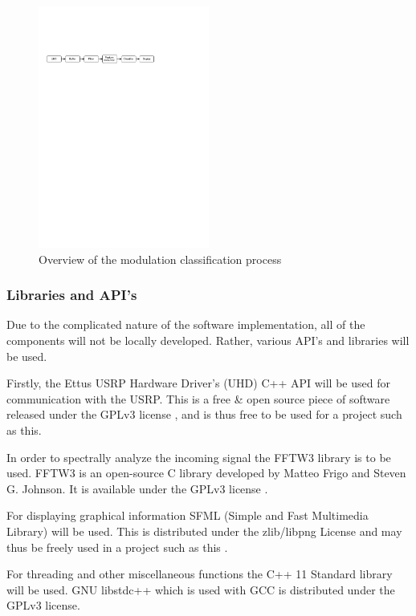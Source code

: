 \documentclass[10pt,twocolumn]{witseiepaper}
\begin{document}
			\begin{figure}[h!]
				\centering
				\includegraphics[trim=1.2cm 31.5cm 9cm 8cm, clip=true,width=0.5\textwidth]{small.pdf}
				\caption{Overview of the modulation classification process}
				\label{fig:sw_overview}
			\end{figure}

		\subsubsection{Libraries and API's}
			Due to the complicated nature of the software implementation, all of the components will not be locally developed. Rather, various API's and libraries will be used.

			Firstly, the Ettus USRP Hardware Driver's (UHD) C++ API will be used for communication with the USRP. This is a free \& open source piece of software released under the GPLv3 license \cite{uhd_license}, and is thus free to be used for a project such as this.

			In order to spectrally analyze the incoming signal the FFTW3 library is to be used. FFTW3 is an open-source C library developed by Matteo Frigo and Steven G. Johnson. It is available under the GPLv3 license \cite{fftw3_license}.

			For displaying graphical information SFML (Simple and Fast Multimedia Library) will be used. This is distributed under the zlib/libpng License and may thus be freely used in a project such as this \cite{sfml_license}.

			For threading and other miscellaneous functions the C++ 11 Standard library will be used. GNU libstdc++ which is used with GCC is distributed under the GPLv3 license.
\end{document}
